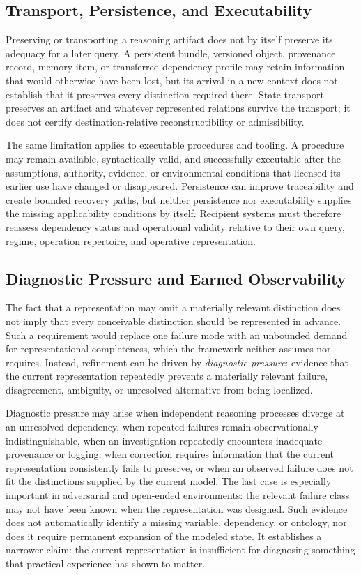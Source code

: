 \documentclass[11pt]{article}
\theoremstyle{definition}
\theoremstyle{remark}
\begin{document}
\subsection{Transport, Persistence, and Executability}

Preserving or transporting a reasoning artifact does not by itself preserve its adequacy for a later query. A persistent bundle, versioned object, provenance record, memory item, or transferred dependency profile may retain information that would otherwise have been lost, but its arrival in a new context does not establish that it preserves every distinction required there. State transport preserves an artifact and whatever represented relations survive the transport; it does not certify destination-relative reconstructibility or admissibility.

The same limitation applies to executable procedures and tooling. A procedure may remain available, syntactically valid, and successfully executable after the assumptions, authority, evidence, or environmental conditions that licensed its earlier use have changed or disappeared. Persistence can improve traceability and create bounded recovery paths, but neither persistence nor executability supplies the missing applicability conditions by itself. Recipient systems must therefore reassess dependency status and operational validity relative to their own query, regime, operation repertoire, and operative representation.

\subsection{Diagnostic Pressure and Earned Observability}

The fact that a representation may omit a materially relevant distinction does not imply that every conceivable distinction should be represented in advance. Such a requirement would replace one failure mode with an unbounded demand for representational completeness, which the framework neither assumes nor requires. Instead, refinement can be driven by \emph{diagnostic pressure}: evidence that the current representation repeatedly prevents a materially relevant failure, disagreement, ambiguity, or unresolved alternative from being localized.

Diagnostic pressure may arise when independent reasoning processes diverge at an unresolved dependency, when repeated failures remain observationally indistinguishable, when an investigation repeatedly encounters inadequate provenance or logging, when correction requires information that the current representation consistently fails to preserve, or when an observed failure does not fit the distinctions supplied by the current model. The last case is especially important in adversarial and open-ended environments: the relevant failure class may not have been known when the representation was designed. Such evidence does not automatically identify a missing variable, dependency, or ontology, nor does it require permanent expansion of the modeled state. It establishes a narrower claim: the current representation is insufficient for diagnosing something that practical experience has shown to matter.
\end{document}
